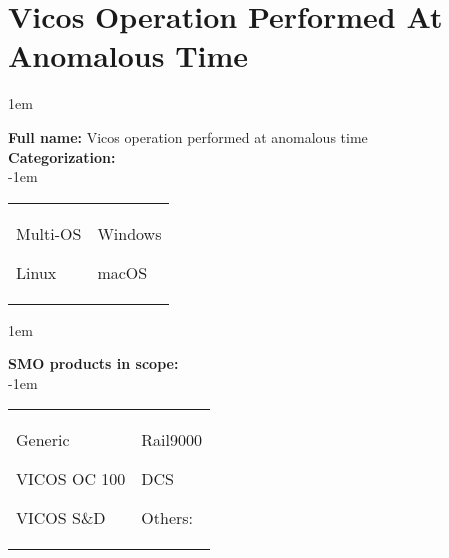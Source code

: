 
%
%

\section{Vicos Operation Performed At Anomalous Time}
\label{15206}

\openup 1em

\textbf{Full name:} Vicos operation performed at anomalous time\hrulefill \\
{\bf Categorization:} \\

\openup -1em
\vspace{-3em}

\begin{tabular}{p{}p{}}

\begin{todolist}
  	\item Multi-OS
	\item Linux
\end{todolist}
&
\begin{todolist}
	\item[\done] Windows
	\item macOS
\end{todolist}

\end{tabular}

\openup 1em

{\bf SMO products in scope:} \\

\openup -1em
\vspace{-3em}

\begin{tabular}{p{}p{}}

\begin{todolist}
  \item Generic
  \item[\done] VICOS OC 100
  \item VICOS S\&D
\end{todolist}
&
\begin{todolist}
  \item Rail9000
  \item DCS
  \item Others: \hrulefill
\end{todolist}

\end{tabular}

